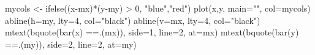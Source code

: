 \begin{Schunk}
\begin{Sinput}
 mycols <- ifelse((x-mx)*(y-my) > 0, "blue","red")
 plot(x,y, main="", col=mycols)
 abline(h=my, lty=4, col="black")
 abline(v=mx, lty=4, col="black")
 mtext(bquote(bar(x) ==.(mx)), side=1, line=2, at=mx)
 mtext(bquote(bar(y) ==.(my)), side=2, line=2, at=my)
\end{Sinput}
\end{Schunk}
